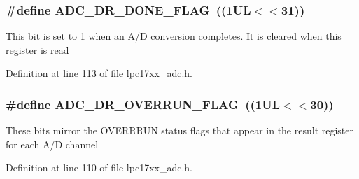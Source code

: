 \hypertarget{group___a_d_c___private___macros_ga4581dfe457aed240077f7056c85d3701}{
\subsubsection[{\-A\-D\-C\-\_\-\-D\-R\-\_\-\-D\-O\-N\-E\-\_\-\-F\-L\-A\-G}]{\setlength{\rightskip}{0pt plus 5cm}\#define {\bf \-A\-D\-C\-\_\-\-D\-R\-\_\-\-D\-O\-N\-E\-\_\-\-F\-L\-A\-G}~((1\-U\-L$<$$<$31))}}\label{group___a_d_c___private___macros_ga4581dfe457aed240077f7056c85d3701}
\-This bit is set to 1 when an \-A/\-D conversion completes. \-It is cleared when this register is read 

\-Definition at line 113 of file lpc17xx\-\_\-adc.\-h.

\hypertarget{group___a_d_c___private___macros_gab986db68d1648ea9289e19c638bc426f}{
\subsubsection[{\-A\-D\-C\-\_\-\-D\-R\-\_\-\-O\-V\-E\-R\-R\-U\-N\-\_\-\-F\-L\-A\-G}]{\setlength{\rightskip}{0pt plus 5cm}\#define {\bf \-A\-D\-C\-\_\-\-D\-R\-\_\-\-O\-V\-E\-R\-R\-U\-N\-\_\-\-F\-L\-A\-G}~((1\-U\-L$<$$<$30))}}\label{group___a_d_c___private___macros_gab986db68d1648ea9289e19c638bc426f}
\-These bits mirror the \-O\-V\-E\-R\-R\-R\-U\-N status flags that appear in the result register for each \-A/\-D channel 

\-Definition at line 110 of file lpc17xx\-\_\-adc.\-h.

